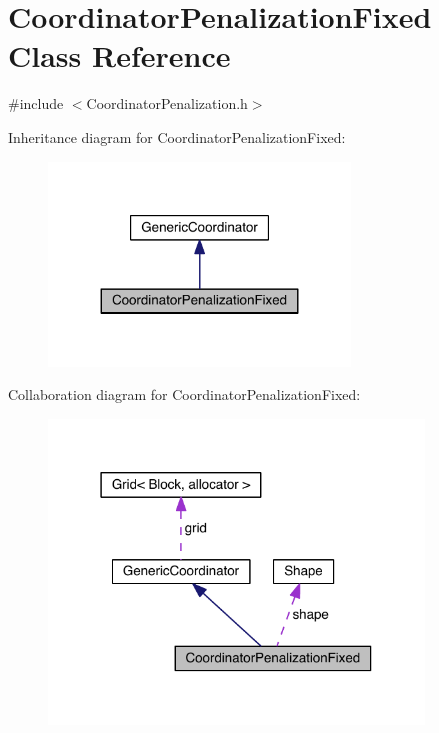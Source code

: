 \hypertarget{class_coordinator_penalization_fixed}{}\section{Coordinator\+Penalization\+Fixed Class Reference}
\label{class_coordinator_penalization_fixed}


{\ttfamily \#include $<$Coordinator\+Penalization.\+h$>$}



Inheritance diagram for Coordinator\+Penalization\+Fixed\+:\nopagebreak
\begin{figure}[H]
\begin{center}
\leavevmode
\includegraphics[width=227pt]{df/d9b/class_coordinator_penalization_fixed__inherit__graph}
\end{center}
\end{figure}


Collaboration diagram for Coordinator\+Penalization\+Fixed\+:\nopagebreak
\begin{figure}[H]
\begin{center}
\leavevmode
\includegraphics[width=283pt]{d4/d66/class_coordinator_penalization_fixed__coll__graph}
\end{center}
\end{figure}
